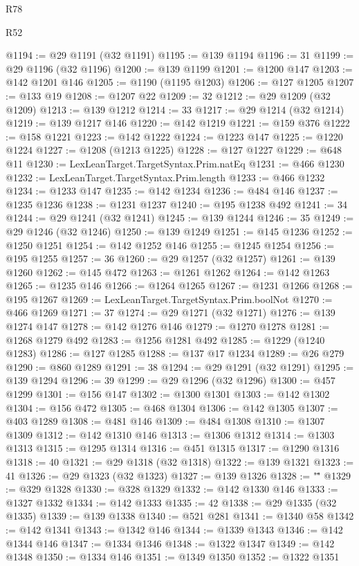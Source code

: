 \begin{lexlean}{R78}
\begin{lexlean}{R52}
\begin{coremodule}
{{{{{{{{{{{{{{{{{{{{{{{{{{{{{{{{{{{{{{{{{{{{{{{{{{{{{{{{{{{{{{{{{{{{{{{{{{{{{{{{{{{{{{{{{{{{{{{{{{{{{{{{{{{{{{{{{{{{{{{{{{{{{{{{{{{{{{{{{{{{{{{{{{{{{{{{{{{{{{{{{{{{{{{{{{{{{{{{{{{{{{{{{{{{{{{{{{{{{{@1194 := @29 @1191 (@32 @1191)
@1195 := @139 @1194
@1196 := 31
@1199 := @29 @1196 (@32 @1196)
@1200 := @139 @1199
@1201 := @1200 @147
@1203 := @142 @1201 @146
@1205 := @1190 (@1195 @1203)
@1206 := @127 @1205
@1207 := @133 @19
@1208 := @1207 @22
@1209 := 32
@1212 := @29 @1209 (@32 @1209)
@1213 := @139 @1212
@1214 := 33
@1217 := @29 @1214 (@32 @1214)
@1219 := @139 @1217 @146
@1220 := @142 @1219
@1221 := @159 @376
@1222 := @158 @1221
@1223 := @142 @1222
@1224 := @1223 @147
@1225 := @1220 @1224
@1227 := @1208 (@1213 @1225)
@1228 := @127 @1227
@1229 := @648 @11
@1230 := LexLeanTarget.TargetSyntax.Prim.natEq
@1231 := @466 @1230
@1232 := LexLeanTarget.TargetSyntax.Prim.length
@1233 := @466 @1232
@1234 := @1233 @147
@1235 := @142 @1234
@1236 := @484 @146
@1237 := @1235 @1236
@1238 := @1231 @1237
@1240 := @195 @1238 @492
@1241 := 34
@1244 := @29 @1241 (@32 @1241)
@1245 := @139 @1244
@1246 := 35
@1249 := @29 @1246 (@32 @1246)
@1250 := @139 @1249
@1251 := @145 @1236
@1252 := @1250 @1251
@1254 := @142 @1252 @146
@1255 := @1245 @1254
@1256 := @195 @1255
@1257 := 36
@1260 := @29 @1257 (@32 @1257)
@1261 := @139 @1260
@1262 := @145 @472
@1263 := @1261 @1262
@1264 := @142 @1263
@1265 := @1235 @146
@1266 := @1264 @1265
@1267 := @1231 @1266
@1268 := @195 @1267
@1269 := LexLeanTarget.TargetSyntax.Prim.boolNot
@1270 := @466 @1269
@1271 := 37
@1274 := @29 @1271 (@32 @1271)
@1276 := @139 @1274 @147
@1278 := @142 @1276 @146
@1279 := @1270 @1278
@1281 := @1268 @1279 @492
@1283 := @1256 @1281 @492
@1285 := @1229 (@1240 @1283)
@1286 := @127 @1285
@1288 := @137 @17 @1234
@1289 := @26 @279
@1290 := @860 @1289
@1291 := 38
@1294 := @29 @1291 (@32 @1291)
@1295 := @139 @1294
@1296 := 39
@1299 := @29 @1296 (@32 @1296)
@1300 := @457 @1299
@1301 := @156 @147
@1302 := @1300 @1301
@1303 := @142 @1302
@1304 := @156 @472
@1305 := @468 @1304
@1306 := @142 @1305
@1307 := @403 @1289
@1308 := @481 @146
@1309 := @484 @1308
@1310 := @1307 @1309
@1312 := @142 @1310 @146
@1313 := @1306 @1312
@1314 := @1303 @1313
@1315 := @1295 @1314
@1316 := @451 @1315
@1317 := @1290 @1316
@1318 := 40
@1321 := @29 @1318 (@32 @1318)
@1322 := @139 @1321
@1323 := 41
@1326 := @29 @1323 (@32 @1323)
@1327 := @139 @1326
@1328 := "\""
@1329 := @329 @1328
@1330 := @328 @1329
@1332 := @142 @1330 @146
@1333 := @1327 @1332
@1334 := @142 @1333
@1335 := 42
@1338 := @29 @1335 (@32 @1335)
@1339 := @139 @1338
@1340 := @521 @281
@1341 := @1340 @58
@1342 := @142 @1341
@1343 := @1342 @146
@1344 := @1339 @1343
@1346 := @142 @1344 @146
@1347 := @1334 @1346
@1348 := @1322 @1347
@1349 := @142 @1348
@1350 := @1334 @146
@1351 := @1349 @1350
@1352 := @1322 @1351
}}}}}}}}}}}}}}}}}}}}}}}}}}}}}}}}}}}}}}}}}}}}}}}}}}}}}}}}}}}}}}}}}}}}}}}}}}}}}}}}}}}}}}}}}}}}}}}}}}}}}}}}}}}}}}}}}}}}}}}}}}}}}}}}}}}}}}}}}}}}}}}}}}}}}}}}}}}}}}}}}}}}}}}}}}}}}}}}}}}}}}}}}}}}}}}}}}}}}}
\end{coremodule}
\end{lexlean}
\end{lexlean}
